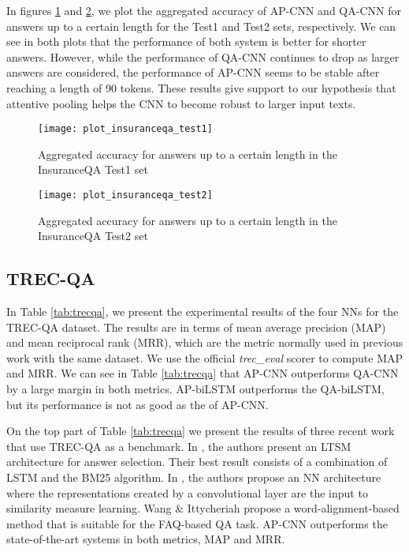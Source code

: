 \documentclass{article}
\begin{document}
In figures \ref{apcnn_vs_qacnn_t1} and \ref{apcnn_vs_qacnn_t2},
we plot the aggregated accuracy of AP-CNN and QA-CNN for answers up to a certain length for the Test1 and Test2 sets,
respectively.
We can see in both plots that the performance of both system is better for shorter answers.
However,
while the performance of QA-CNN continues to drop as larger answers are considered,
the performance of AP-CNN seems to be stable after reaching a length of 90 tokens.
These results give support to our hypothesis that attentive pooling helps the CNN to become robust to larger input texts.

\begin{figure}[ht]
\vskip 0.2in
\begin{center}
\centerline{\texttt{[image: plot\_insuranceqa\_test1]}}
\caption{Aggregated  accuracy for answers
up to a certain length in the InsuranceQA Test1 set}
\label{apcnn_vs_qacnn_t1}
\end{center}
\vskip -0.2in
\end{figure}


\begin{figure}[ht]
\vskip 0.2in
\begin{center}
\centerline{\texttt{[image: plot\_insuranceqa\_test2]}}
\caption{Aggregated accuracy for answers
up to a certain length in the InsuranceQA Test2 set}
\label{apcnn_vs_qacnn_t2}
\end{center}
\vskip -0.2in
\end{figure}


\subsection{TREC-QA}
In Table \ref{tab:trecqa},
we present the experimental results of the four NNs for the TREC-QA dataset.
The results are in terms of mean average precision (MAP) and mean reciprocal rank (MRR),
which are the metric normally used in previous work with the same dataset.
We use the official \emph{trec\_eval} scorer to compute MAP and MRR.
We can see in Table \ref{tab:trecqa} that AP-CNN outperforms QA-CNN by a large margin in both metrics.
AP-biLSTM outperforms the QA-biLSTM,
but its performance is not as good as the of AP-CNN.

On the top part of Table \ref{tab:trecqa} we present the results of three recent work that use TREC-QA as a benchmark.
In \cite{wang2015},
the authors present an LTSM architecture for answer selection. Their best result consists of a combination of LSTM and the BM25 algorithm.
In \cite{severyn2015},
the authors propose an NN architecture where the representations created by a convolutional layer are the input to similarity measure learning.
Wang \& Ittycheriah  propose a word-alignment-based method that is suitable for the FAQ-based QA task.
AP-CNN outperforms the state-of-the-art systems in both metrics,
MAP and MRR.
\end{document}
